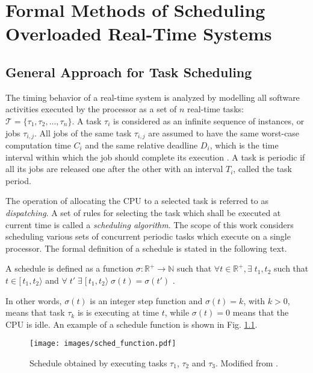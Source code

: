 \chapter{Formal Methods of Scheduling Overloaded Real-Time Systems}
\label{fm}
\section{General Approach for Task Scheduling}
The timing behavior of a real-time system is analyzed by modelling all software activities executed by the processor as a set of $n$ real-time tasks: $\mathcal{T} = \{\tau_1, \tau_2, ..., \tau_n\}$.
A task $\tau_i$ is considered as an infinite sequence of instances, or jobs $\tau_{i,j}$.
All jobs of the same task $\tau_{i,j}$ are assumed to have the same worst-case computation time $C_i$ and the same relative deadline $D_i$, which is the time interval within which the job should complete its execution \cite{lee2007handbook}.
A task is periodic if all its jobs are released one after the other with an interval $T_i$, called the task period. 

The operation of allocating the CPU to a selected task is referred to as \textit{dispatching}.
A set of rules for selecting the task which shall be executed at current time is called a 
\textit{scheduling algorithm}.
The scope of this work considers scheduling various sets of concurrent periodic tasks which execute on a single processor.
The formal definition of a schedule is stated in the following text.
\begin{mydef}
A schedule is defined as a function $\sigma : \mathbb{R}^{+} \rightarrow \mathbb{N}$ such that 
$\forall t \in \mathbb{R}^{+}, \exists \; t_1, t_2$ such that $t \in [\, t_1, t_2 \rangle$ and 
$\forall \; t' \; \exists \; [\, t_1, t_2 \rangle \; \sigma(t) = \sigma(t')$
\cite{buttazzo2011hard}.
\end{mydef}
In other words, $\sigma(t)$ is an integer step function and $\sigma(t) = k$, with $k > 0$, means that task $\tau_k$ is is executing at time $t$, while $\sigma(t) = 0$ means that the CPU is idle.
An example of a schedule function is shown in Fig. \ref{schedule_function}.
\begin{figure}[ht]
    \centering
    \texttt{[image: images/sched\_function.pdf]}
    \caption{Schedule obtained by executing tasks $\tau_1$, $\tau_2$ and $\tau_3$. Modified from \cite{buttazzo2011hard}.}
    \label{schedule_function}
\end{figure}


